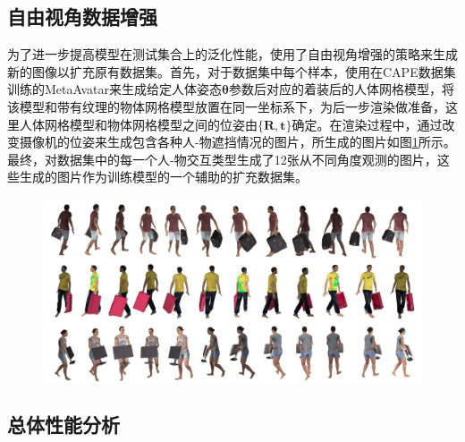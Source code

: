 \subsection{自由视角数据增强}
为了进一步提高模型在测试集合上的泛化性能，使用了自由视角增强的策略来生成新的图像以扩充原有数据集。首先，对于数据集中每个样本，使用在CAPE数据集\citep{Pons-Moll:Siggraph2017, Ma2019LearningTD}训练的MetaAvatar\citep{Wang2021MetaAvatarLA}来生成给定人体姿态$\mathbf{\theta}$参数后对应的着装后的人体网格模型，将该模型和带有纹理的物体网格模型放置在同一坐标系下，为后一步渲染做准备，这里人体网格模型和物体网格模型之间的位姿由$\{\mathbf{R}, \mathbf{t}\}$确定。在渲染过程中，通过改变摄像机的位姿来生成包含各种人-物遮挡情况的图片，所生成的图片如图\ref{fig:view_aug}所示。最终，对数据集中的每一个人-物交互类型生成了12张从不同角度观测的图片，这些生成的图片作为训练模型的一个辅助的扩充数据集。

\begin{figure}[!htbp]
	\centering
	\includegraphics{Img/view_aug}
	\label{fig:view_aug}
\end{figure}

\subsection{总体性能分析}
